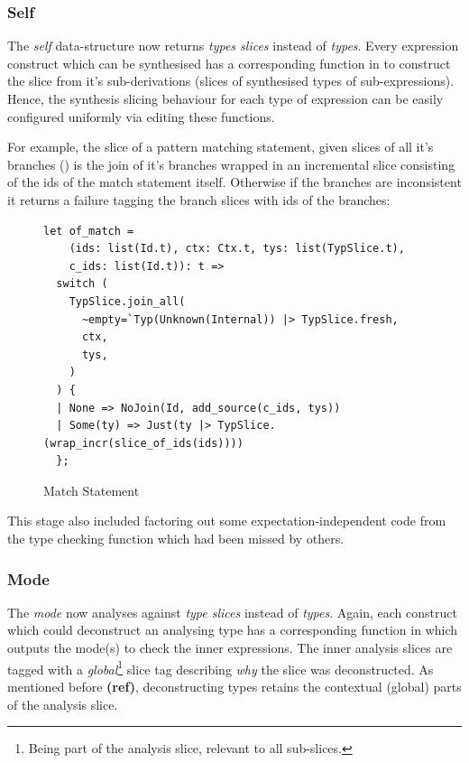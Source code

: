 \subsubsection{Self}
The \textit{self} data-structure now returns \textit{types slices} instead of \textit{types}. Every expression construct which can be synthesised has a corresponding function in  to construct the slice from it's sub-derivations (slices of synthesised types of sub-expressions). Hence, the synthesis slicing behaviour for each type of expression can be easily configured uniformly via editing these functions.

For example, the slice of a pattern matching statement, given slices of all it's branches () is the join of it's branches wrapped in an incremental slice consisting of the ids of the match statement itself. Otherwise if the branches are inconsistent it returns a failure tagging the branch slices with ids of the branches:
\begin{figure}[h]
\begin{verbatim}
let of_match =
    (ids: list(Id.t), ctx: Ctx.t, tys: list(TypSlice.t), 
    c_ids: list(Id.t)): t =>
  switch (
    TypSlice.join_all(
      ~empty=`Typ(Unknown(Internal)) |> TypSlice.fresh,
      ctx,
      tys,
    )
  ) {
  | None => NoJoin(Id, add_source(c_ids, tys))
  | Some(ty) => Just(ty |> TypSlice.(wrap_incr(slice_of_ids(ids))))
  };
\end{verbatim}
\caption{Match Statement }
\end{figure}

This stage also included factoring out some expectation-independent code from the type checking function which had been missed by others.

\subsubsection{Mode}
The \textit{mode} now analyses against \textit{type slices} instead of \textit{types}. Again, each construct which could deconstruct an analysing type has a corresponding function in  which outputs the mode(s) to check the inner expressions. The inner analysis slices are tagged with a \textit{global}\footnote{Being part of the analysis slice, relevant to all sub-slices.} slice tag describing \textit{why} the slice was deconstructed. As mentioned before \textbf{(ref)}, deconstructing types retains the contextual (global) parts of the analysis slice.

